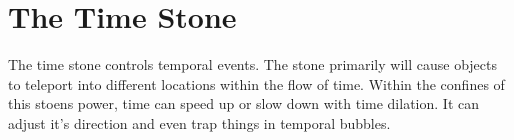 \section{The Time Stone}

The time stone controls temporal events. The stone primarily will cause objects to teleport into different locations within the flow of time. Within the confines of this stoens power, time can speed up or slow down with time dilation. It can adjust it's direction and even trap things in temporal bubbles.